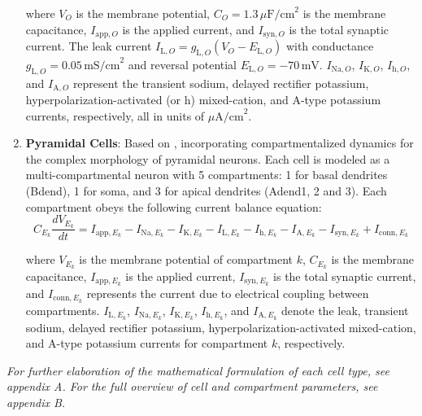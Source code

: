 \begin{enumerate}
          where \(V_O\) is the membrane potential, \(C_O = 1.3 \, \mu\text{F/cm}^2\) is
          the membrane capacitance, \(I_{\text{app},O}\) is the applied current, and
          \(I_{\text{syn},O}\) is the total synaptic current. The leak current
          \(I_{\text{L},O} = g_{\text{L},O}(V_O - E_{\text{L},O})\) with conductance
          \(g_{\text{L},O} = 0.05 \, \text{mS/cm}^2\) and reversal potential
          \(E_{\text{L},O} = -70 \, \text{mV}\). \(I_{\text{Na},O}\), \(I_{\text{K},O}\),
          \(I_{\text{h},O}\), and \(I_{\text{A},O}\) represent the transient sodium,
          delayed rectifier potassium, hyperpolarization-activated (or h) mixed-cation,
          and A-type potassium currents, respectively, all in units of
          \(\mu\text{A/cm}^2\).
    \item \textbf{Pyramidal Cells}: Based on \textcite{miglioreDendriticIhSelectivelyBlocks2004},
          incorporating compartmentalized dynamics for the complex morphology of pyramidal neurons.
          Each cell is modeled as a multi-compartmental neuron with 5 compartments: 1 for basal dendrites (Bdend),
          1 for soma, and 3 for apical dendrites (Adend1, 2 and 3). Each compartment obeys the following current balance equation:
          \begin{equation}
              C_{E_k} \frac{dV_{E_k}}{dt} = I_{\text{app},E_k} - I_{\text{Na},E_k} - I_{\text{K},E_k} - I_{\text{L},E_k} - I_{\text{h},E_k} - I_{\text{A},E_k} - I_{\text{syn},E_k} + I_{\text{conn},E_k}
          \end{equation}

          where \(V_{E_k}\) is the membrane potential of compartment \(k\), \(C_{E_k}\)
          is the membrane capacitance, \(I_{\text{app},E_k}\) is the applied current,
          \(I_{\text{syn},E_k}\) is the total synaptic current, and
          \(I_{\text{conn},E_k}\) represents the current due to electrical coupling
          between compartments. \(I_{\text{L},E_k}\), \(I_{\text{Na},E_k}\),
          \(I_{\text{K},E_k}\), \(I_{\text{h},E_k}\), and \(I_{\text{A},E_k}\) denote the
          leak, transient sodium, delayed rectifier potassium,
          hyperpolarization-activated mixed-cation, and A-type potassium currents for
          compartment \(k\), respectively.
\end{enumerate}

\noindent
\textit{For further elaboration of the mathematical formulation of each cell type, see appendix A. For the full overview of cell and compartment parameters, see appendix
    B.}

